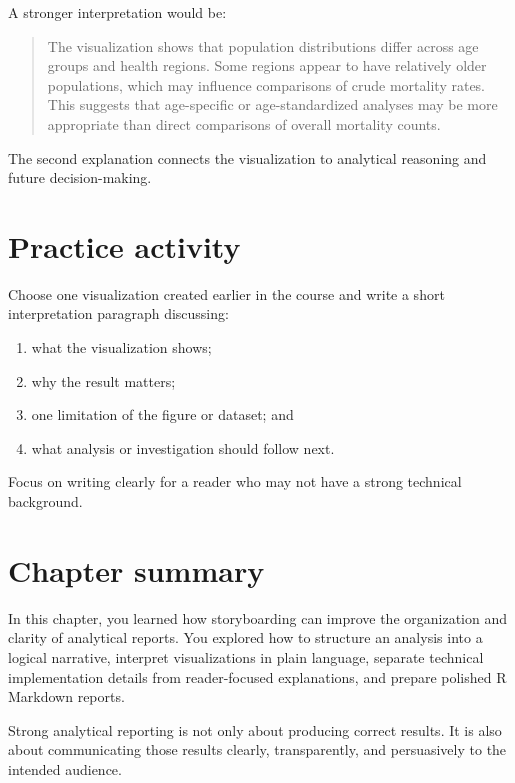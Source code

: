 \documentclass[
  11pt,
  oneside]{book}
\providecommand{\tightlist}{%
  \setlength{\itemsep}{0pt}\setlength{\parskip}{0pt}}
\begin{document}
A stronger interpretation would be:

\begin{quote}
The visualization shows that population distributions differ across age groups and health regions. Some regions appear to have relatively older populations, which may influence comparisons of crude mortality rates. This suggests that age-specific or age-standardized analyses may be more appropriate than direct comparisons of overall mortality counts.
\end{quote}

The second explanation connects the visualization to analytical reasoning and future decision-making.

\section{Practice activity}\label{practice-activity-1}

Choose one visualization created earlier in the course and write a short interpretation paragraph discussing:

\begin{enumerate}
\def\labelenumi{\arabic{enumi}.}
\tightlist
\item
  what the visualization shows;
\item
  why the result matters;
\item
  one limitation of the figure or dataset; and
\item
  what analysis or investigation should follow next.
\end{enumerate}

Focus on writing clearly for a reader who may not have a strong technical background.

\section{Chapter summary}\label{chapter-summary-7}

In this chapter, you learned how storyboarding can improve the organization and clarity of analytical reports. You explored how to structure an analysis into a logical narrative, interpret visualizations in plain language, separate technical implementation details from reader-focused explanations, and prepare polished R Markdown reports.

Strong analytical reporting is not only about producing correct results. It is also about communicating those results clearly, transparently, and persuasively to the intended audience.
\end{document}
